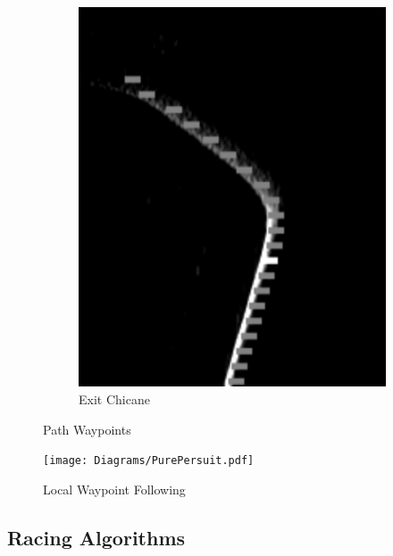 \begin{figure}[H]
\begin{subfigure}[b]{0.32\textwidth}
                 \includegraphics[width=\textwidth,height=0.2\textheight]{visionpipeline/apprachLeft.png}
                 \caption{Exit Chicane}
                 \label{fig:exitChicane}
              \end{subfigure}
              \caption{Path Waypoints}
              \label{fig:PathWayPoints}
           \end{figure}


        \begin{figure}[H]
            \centering
            \texttt{[image: Diagrams/PurePersuit.pdf]}
            \caption{Local Waypoint Following}
            \label{fig:PurePersuit}
        \end{figure}

        
        \pagebreak{}
        \subsection{Racing Algorithms}
